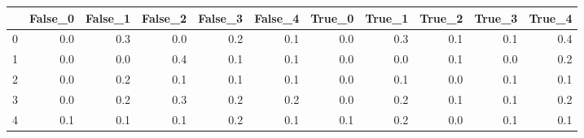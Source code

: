 \begin{tabular}{lrrrrrrrrrr}
\toprule
{} &  False\_0 &  False\_1 &  False\_2 &  False\_3 &  False\_4 &  True\_0 &  True\_1 &  True\_2 &  True\_3 &  True\_4 \\ \hline
\midrule
0 &      0.0 &      0.3 &      0.0 &      0.2 &      0.1 &     0.0 &     0.3 &     0.1 &     0.1 &     0.4 \\ \hline
1 &      0.0 &      0.0 &      0.4 &      0.1 &      0.1 &     0.0 &     0.0 &     0.1 &     0.0 &     0.2 \\ \hline
2 &      0.0 &      0.2 &      0.1 &      0.1 &      0.1 &     0.0 &     0.1 &     0.0 &     0.1 &     0.1 \\ \hline
3 &      0.0 &      0.2 &      0.3 &      0.2 &      0.2 &     0.0 &     0.2 &     0.1 &     0.1 &     0.2 \\ \hline
4 &      0.1 &      0.1 &      0.1 &      0.2 &      0.1 &     0.1 &     0.2 &     0.0 &     0.1 &     0.1 \\ \hline
\bottomrule
\end{tabular}
